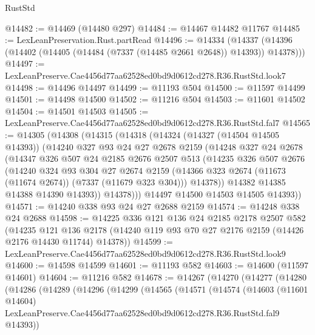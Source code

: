\begin{lexlean}{RustStd}
\begin{coremodule}
@14482 := @14469 (@14480 @297)
@14484 := @14467 @14482 @11767
@14485 := LexLeanPreservation.Rust.partRead
@14496 := @14334
    (@14337 (@14396 (@14402 (@14405 (@14484 (@7337 (@14485 @2661 @2648)) @14393)) @14378)))
@14497 := LexLeanPreserve.Cae4456d77aa62528ed0bd9d0612cd278.R36.RustStd.look7
@14498 := @14496 @14497
@14499 := @11193 @504
@14500 := @11597 @14499
@14501 := @14498 @14500
@14502 := @11216 @504
@14503 := @11601 @14502
@14504 := @14501 @14503
@14505 := LexLeanPreserve.Cae4456d77aa62528ed0bd9d0612cd278.R36.RustStd.fal7
@14565 := @14305
    (@14308
      (@14315
        (@14318
          (@14324
            (@14327 (@14504 @14505 @14393))
            (@14240
              @327
              @93
              @24
              @27
              @2678
              @2159
              (@14248
                @327
                @24
                @2678
                (@14347
                  @326
                  @507
                  @24
                  @2185
                  @2676
                  @2507
                  @513
                  (@14235
                    @326
                    @507
                    @2676
                    (@14240
                      @324
                      @93
                      @304
                      @27
                      @2674
                      @2159
                      (@14366 @323 @2674 (@11673 (@11674 @2674)) (@7337 (@11679 @323 @304)))
                      @14378))
                  @14382
                  @14385
                  @14388
                  @14390
                  @14393))
              @14378)))
        @14497
        @14500
        @14503
        @14505
        @14393))
@14571 := @14240 @338 @93 @24 @27 @2688 @2159
@14574 := @14248 @338 @24 @2688
@14598 := @14225
    @336
    @121
    @136
    @24
    @2185
    @2178
    @2507
    @582
    (@14235
      @121
      @136
      @2178
      (@14240 @119 @93 @70 @27 @2176 @2159 (@14426 @2176 @14430 @11744) @14378))
@14599 := LexLeanPreserve.Cae4456d77aa62528ed0bd9d0612cd278.R36.RustStd.look9
@14600 := @14598 @14599
@14601 := @11193 @582
@14603 := @14600 (@11597 @14601)
@14604 := @11216 @582
@14678 := @14267
    (@14270
      (@14277
        (@14280
          (@14286
            (@14289
              (@14296
                (@14299
                  (@14565
                    (@14571
                      (@14574
                        (@14603
                          (@11601 @14604)
                          LexLeanPreserve.Cae4456d77aa62528ed0bd9d0612cd278.R36.RustStd.fal9
                          @14393))

\end{coremodule}
\end{lexlean}
